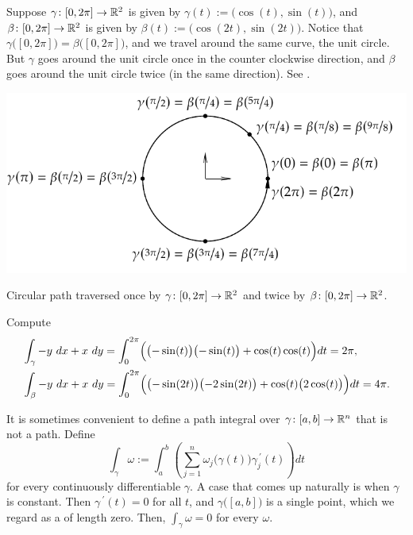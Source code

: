\begin{example}
Suppose $\gamma \colon [0,2\pi] \to {\mathbb{R}}^2$ is given by $\gamma(t) :=
\bigl(\cos(t),\sin(t)\bigr)$, and
$\beta \colon [0,2\pi] \to {\mathbb{R}}^2$ is given by $\beta(t) :=
\bigl(\cos(2t),\sin(2t)\bigr)$.  Notice that
$\gamma\bigl([0,2\pi]\bigr) = \beta\bigl([0,2\pi]\bigr)$, and we travel
around the same curve, the unit circle.  But $\gamma$ goes around the unit
circle once in the counter clockwise direction, and $\beta$ goes around the
unit circle twice (in the same direction). 
See .
\begin{myfigureht}
\includegraphics{figures/circlepathrepar2}
\caption{Circular path traversed once by
$\gamma \colon [0,2\pi] \to {\mathbb{R}}^2$
and twice by
$\beta \colon [0,2\pi] \to {\mathbb{R}}^2$.\label{fig:circlepathrepar2}}
\end{myfigureht}

Compute
\begin{align*}
& \int_{\gamma} -y~ dx + x~dy
=
\int_0^{2\pi}
\Bigl( \bigl(-\sin(t) \bigr) \bigl(-\sin(t) \bigr) + \cos(t) \cos(t) \Bigr) dt
=
2 \pi,\\
& \int_{\beta} -y~ dx + x~dy
=
\int_0^{2\pi}
\Bigl( \bigl(-\sin(2t) \bigr) \bigl(-2\sin(2t) \bigr) + \cos(t)
\bigl(2\cos(t)\bigr) \Bigr) dt
=
4 \pi.
\end{align*}
\end{example}

It is sometimes convenient to define a path integral over $\gamma \colon
[a,b] \to {\mathbb{R}}^n$ that is not a path.
Define
\begin{equation*}
\int_{\gamma} \omega := \int_a^b
\left(
\sum_{j=1}^n
\omega_j\bigl(\gamma(t)\bigr) \gamma_j^{\:\prime}(t)
\right) dt 
\end{equation*}
for every continuously differentiable $\gamma$.  A 
case that comes up naturally is when $\gamma$ is constant.  Then
$\gamma^{\:\prime}(t) = 0$ for all $t$, and $\gamma\bigl([a,b]\bigr)$ is a single
point, which we regard as a  of length zero.  Then,
$\int_{\gamma} \omega = 0$ for every $\omega$.

